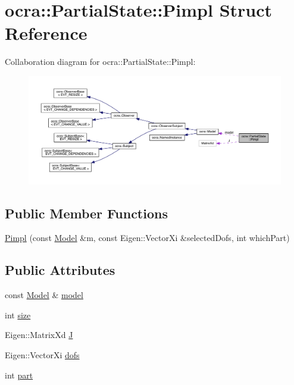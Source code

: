 \hypertarget{structocra_1_1PartialState_1_1Pimpl}{}\section{ocra\+:\+:Partial\+State\+:\+:Pimpl Struct Reference}
\label{structocra_1_1PartialState_1_1Pimpl}


Collaboration diagram for ocra\+:\+:Partial\+State\+:\+:Pimpl\+:
\nopagebreak
\begin{figure}[H]
\begin{center}
\leavevmode
\includegraphics[width=350pt]{dd/df3/structocra_1_1PartialState_1_1Pimpl__coll__graph}
\end{center}
\end{figure}
\subsection*{Public Member Functions}
\begin{DoxyCompactItemize}
\item 
\hyperlink{structocra_1_1PartialState_1_1Pimpl_a4f12abe2e984af1d293d847dc3456724}{Pimpl} (const \hyperlink{classocra_1_1Model}{Model} \&m, const Eigen\+::\+Vector\+Xi \&selected\+Dofs, int which\+Part)
\end{DoxyCompactItemize}
\subsection*{Public Attributes}
\begin{DoxyCompactItemize}
\item 
const \hyperlink{classocra_1_1Model}{Model} \& \hyperlink{structocra_1_1PartialState_1_1Pimpl_a45e5572b9e9cbe6ac2d9ba4107a58bd6}{model}
\item 
int \hyperlink{structocra_1_1PartialState_1_1Pimpl_ac60f12a932c9bac309b2c1794de57a9c}{size}
\item 
Eigen\+::\+Matrix\+Xd \hyperlink{structocra_1_1PartialState_1_1Pimpl_a7c31cf81faa6abbbe780b9f143094418}{J}
\item 
Eigen\+::\+Vector\+Xi \hyperlink{structocra_1_1PartialState_1_1Pimpl_a206c2d1097d24706e5bf2d3a9b0862a8}{dofs}
\item 
int \hyperlink{structocra_1_1PartialState_1_1Pimpl_a605a55abed1d170fa6911088fefa7337}{part}
\end{DoxyCompactItemize}


